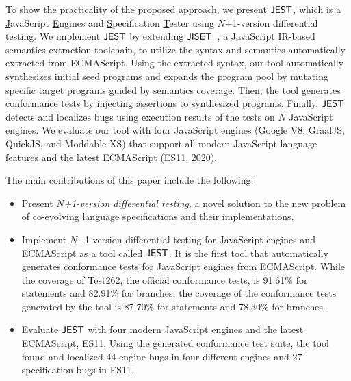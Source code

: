To show the practicality of the proposed approach, we present $\tool$, which
is a \underline{J}avaScript \underline{E}ngines and
\underline{S}pecification \underline{T}ester using $N$+1-version differential testing.
We implement $\tool$ by extending $\jiset$~\cite{jiset}, a JavaScript
IR-based semantics extraction toolchain, to utilize the syntax and semantics
automatically extracted from ECMAScript.  Using the extracted syntax,
our tool automatically synthesizes initial seed programs and expands the program
pool by mutating specific target programs guided by semantics coverage.  Then,
the tool generates conformance tests by injecting assertions to synthesized
programs.  Finally, $\tool$ detects and localizes bugs using execution
results of the tests on $N$ JavaScript engines.  We evaluate our tool with four
JavaScript engines (Google V8\cite{v8}, GraalJS\cite{graaljs}, QuickJS\cite{qjs},
and Moddable XS\cite{xs}) that support all modern JavaScript language
features and the latest ECMAScript (ES11, 2020).

The main contributions of this paper include the following:
\begin{itemize}
  \item Present \textit{$N$+1-version differential testing}, a novel solution to the new
    problem of co-evolving language specifications and their implementations.
  \item Implement $N$+1-version differential testing for JavaScript engines and
    ECMAScript as a tool called $\tool$. It is the first tool that automatically generates conformance
    tests for JavaScript engines from ECMAScript.  While the coverage
    of Test262, the official conformance tests, is 91.61\% for statements
    and 82.91\% for branches, the coverage of the conformance tests generated by the tool
    is 87.70\% for statements and 78.30\% for branches.
  \item Evaluate $\tool$ with four modern JavaScript engines and the latest
    ECMAScript, ES11.  Using the generated conformance test
    suite, the tool found and localized 44 engine bugs in four different
    engines and 27 specification bugs in ES11.
\end{itemize}
